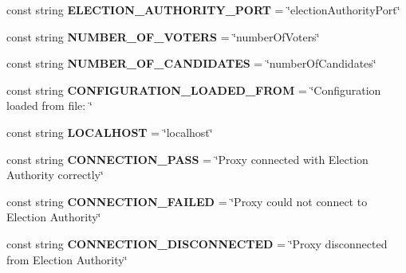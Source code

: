 \begin{DoxyCompactItemize}
\item 
\hypertarget{class_proxy_1_1_constants_ac3a1f48b397844e47b6e94b03bc50659}{}const string {\bfseries E\+L\+E\+C\+T\+I\+O\+N\+\_\+\+A\+U\+T\+H\+O\+R\+I\+T\+Y\+\_\+\+P\+O\+R\+T} = \char`\"{}election\+Authority\+Port\char`\"{}\label{class_proxy_1_1_constants_ac3a1f48b397844e47b6e94b03bc50659}

\item 
\hypertarget{class_proxy_1_1_constants_a2ba2bd2494b4cd5825cfe0c3b95f6c44}{}const string {\bfseries N\+U\+M\+B\+E\+R\+\_\+\+O\+F\+\_\+\+V\+O\+T\+E\+R\+S} = \char`\"{}number\+Of\+Voters\char`\"{}\label{class_proxy_1_1_constants_a2ba2bd2494b4cd5825cfe0c3b95f6c44}

\item 
\hypertarget{class_proxy_1_1_constants_a5969f0c7f5849df11e7ed616463eb4dd}{}const string {\bfseries N\+U\+M\+B\+E\+R\+\_\+\+O\+F\+\_\+\+C\+A\+N\+D\+I\+D\+A\+T\+E\+S} = \char`\"{}number\+Of\+Candidates\char`\"{}\label{class_proxy_1_1_constants_a5969f0c7f5849df11e7ed616463eb4dd}

\item 
\hypertarget{class_proxy_1_1_constants_a941d0d09fa672ac060f0b0d37422fe5a}{}const string {\bfseries C\+O\+N\+F\+I\+G\+U\+R\+A\+T\+I\+O\+N\+\_\+\+L\+O\+A\+D\+E\+D\+\_\+\+F\+R\+O\+M} = \char`\"{}Configuration loaded from file\+: \char`\"{}\label{class_proxy_1_1_constants_a941d0d09fa672ac060f0b0d37422fe5a}

\item 
\hypertarget{class_proxy_1_1_constants_adb729ef27af04aead2d0b7c2bc942111}{}const string {\bfseries L\+O\+C\+A\+L\+H\+O\+S\+T} = \char`\"{}localhost\char`\"{}\label{class_proxy_1_1_constants_adb729ef27af04aead2d0b7c2bc942111}

\item 
\hypertarget{class_proxy_1_1_constants_a8495f1a151a757d24d1afc51cb6ed05f}{}const string {\bfseries C\+O\+N\+N\+E\+C\+T\+I\+O\+N\+\_\+\+P\+A\+S\+S} = \char`\"{}Proxy connected with Election Authority correctly\char`\"{}\label{class_proxy_1_1_constants_a8495f1a151a757d24d1afc51cb6ed05f}

\item 
\hypertarget{class_proxy_1_1_constants_aee3e4ae80572db4810678e504d679235}{}const string {\bfseries C\+O\+N\+N\+E\+C\+T\+I\+O\+N\+\_\+\+F\+A\+I\+L\+E\+D} = \char`\"{}Proxy could not connect to Election Authority\char`\"{}\label{class_proxy_1_1_constants_aee3e4ae80572db4810678e504d679235}

\item 
\hypertarget{class_proxy_1_1_constants_a7641bdd900a2d9357ffdb0339332701f}{}const string {\bfseries C\+O\+N\+N\+E\+C\+T\+I\+O\+N\+\_\+\+D\+I\+S\+C\+O\+N\+N\+E\+C\+T\+E\+D} = \char`\"{}Proxy disconnected from Election Authority\char`\"{}\label{class_proxy_1_1_constants_a7641bdd900a2d9357ffdb0339332701f}


\end{DoxyCompactItemize}
